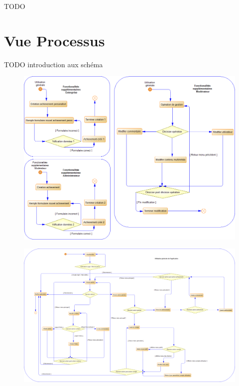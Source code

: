 \documentclass{life-fr}
\begin{document}
TODO


\chapter{Vue Processus}

TODO introduction aux schéma

\begin{figure}[H]
  \begin{center}
    \includegraphics[width=15cm]{img/processus_principaux_1.png}
  \end{center}
\end{figure}

\newpage

\begin{figure}[H]
  \begin{center}
    \includegraphics[width=15cm]{img/processus_principaux_2.png}
  \end{center}
\end{figure}
\end{document}
